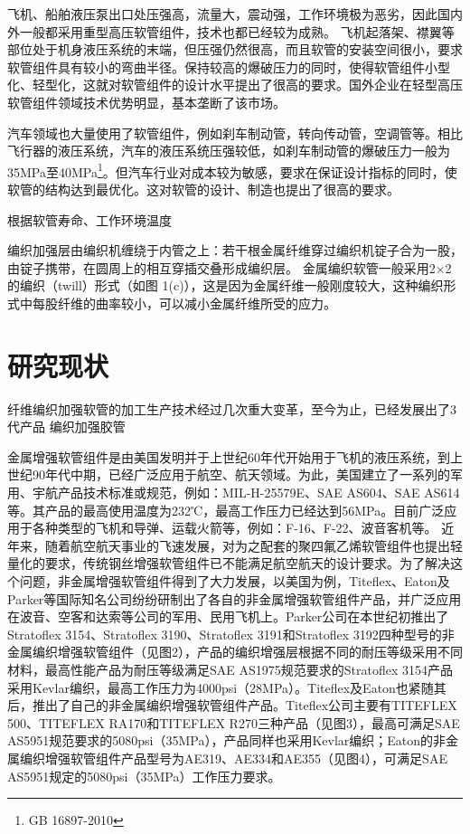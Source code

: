 飞机、船舶液压泵出口处压强高，流量大，震动强，工作环境极为恶劣，因此国内外一般都采用重型高压软管组件，技术也都已经较为成熟。
飞机起落架、襟翼等部位处于机身液压系统的末端，但压强仍然很高，而且软管的安装空间很小，要求软管组件具有较小的弯曲半径。保持较高的爆破压力的同时，使得软管组件小型化、轻型化，这就对软管组件的设计水平提出了很高的要求。国外企业在轻型高压软管组件领域技术优势明显，基本垄断了该市场。

汽车领域也大量使用了软管组件，例如刹车制动管，转向传动管，空调管等。相比飞行器的液压系统，汽车的液压系统压强较低，如刹车制动管的爆破压力一般为35MPa至40MPa\footnote{GB 16897-2010}。但汽车行业对成本较为敏感，要求在保证设计指标的同时，使软管的结构达到最优化。这对软管的设计、制造也提出了很高的要求。

根据软管寿命、工作环境温度











编织加强层由编织机缠绕于内管之上：若干根金属纤维穿过编织机锭子合为一股，由锭子携带，在圆周上的相互穿插交叠形成编织层。
金属编织软管一般采用2×2的编织（twill）形式（如图 1(c)），这是因为金属纤维一般刚度较大，这种编织形式中每股纤维的曲率较小，可以减小金属纤维所受的应力。

 	 	 
					
\section{研究现状}

纤维编织加强软管的加工生产技术经过几次重大变革，至今为止，已经发展出了3代产品
编织加强胶管

金属增强软管组件是由美国发明并于上世纪60年代开始用于飞机的液压系统，到上世纪90年代中期，已经广泛应用于航空、航天领域。为此，美国建立了一系列的军用、宇航产品技术标准或规范，例如：MIL-H-25579E、SAE AS604、SAE AS614等。其产品的最高使用温度为232℃，最高工作压力已经达到56MPa。目前广泛应用于各种类型的飞机和导弹、运载火箭等，例如：F-16、F-22、波音客机等。
近年来，随着航空航天事业的飞速发展，对为之配套的聚四氟乙烯软管组件也提出轻量化的要求，传统钢丝增强软管组件已不能满足航空航天的设计要求。为了解决这个问题，非金属增强软管组件得到了大力发展，以美国为例，Titeflex、Eaton及Parker等国际知名公司纷纷研制出了各自的非金属增强软管组件产品，并广泛应用在波音、空客和达索等公司的军用、民用飞机上。Parker公司在本世纪初推出了Stratoflex 3154、Stratoflex 3190、Stratoflex 3191和Stratoflex 3192四种型号的非金属编织增强软管组件（见图2），产品的编织增强层根据不同的耐压等级采用不同材料，最高性能产品为耐压等级满足SAE AS1975规范要求的Stratoflex 3154产品采用Kevlar编织，最高工作压力为4000psi（28MPa）。Titeflex及Eaton也紧随其后，推出了自己的非金属编织增强软管组件产品。Titeflex公司主要有TITEFLEX 500、TITEFLEX RA170和TITEFLEX R270三种产品（见图3），最高可满足SAE AS5951规范要求的5080psi（35MPa），产品同样也采用Kevlar编织；Eaton的非金属编织增强软管组件产品型号为AE319、AE334和AE355（见图4），可满足SAE AS5951规定的5080psi（35MPa）工作压力要求。



